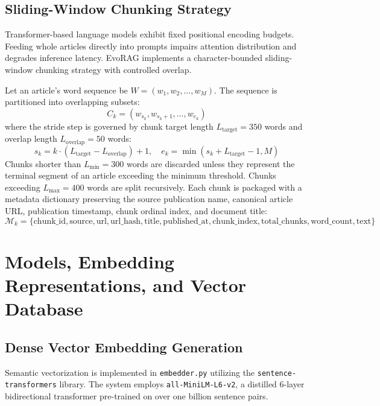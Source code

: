 \subsection{Sliding-Window Chunking Strategy}
Transformer-based language models exhibit fixed positional encoding budgets. Feeding whole articles directly into prompts impairs attention distribution and degrades inference latency. EvoRAG implements a character-bounded sliding-window chunking strategy with controlled overlap.

Let an article's word sequence be $W = (w_1, w_2, \dots, w_M)$. The sequence is partitioned into overlapping subsets:
\begin{equation}
\label{eq:chunk_window}
C_k = (w_{s_k}, w_{s_k + 1}, \dots, w_{e_k})
\end{equation}
where the stride step is governed by chunk target length $L_{\text{target}} = 350$ words and overlap length $L_{\text{overlap}} = 50$ words:
\begin{equation}
s_k = k \cdot (L_{\text{target}} - L_{\text{overlap}}) + 1, \quad e_k = \min(s_k + L_{\text{target}} - 1, M)
\end{equation}
Chunks shorter than $L_{\text{min}} = 300$ words are discarded unless they represent the terminal segment of an article exceeding the minimum threshold. Chunks exceeding $L_{\text{max}} = 400$ words are split recursively. Each chunk is packaged with a metadata dictionary preserving the source publication name, canonical article URL, publication timestamp, chunk ordinal index, and document title:
\begin{equation}
\mathcal{M}_k = \{ \text{chunk\_id}, \text{source}, \text{url}, \text{url\_hash}, \text{title}, \text{published\_at}, \text{chunk\_index}, \text{total\_chunks}, \text{word\_count}, \text{text} \}
\end{equation}

\section{Models, Embedding Representations, and Vector Database}
\label{sec:models_vector}

\subsection{Dense Vector Embedding Generation}
Semantic vectorization is implemented in \texttt{embedder.py} utilizing the \texttt{sentence-transformers} library. The system employs \texttt{all-MiniLM-L6-v2}, a distilled 6-layer bidirectional transformer pre-trained on over one billion sentence pairs. 


